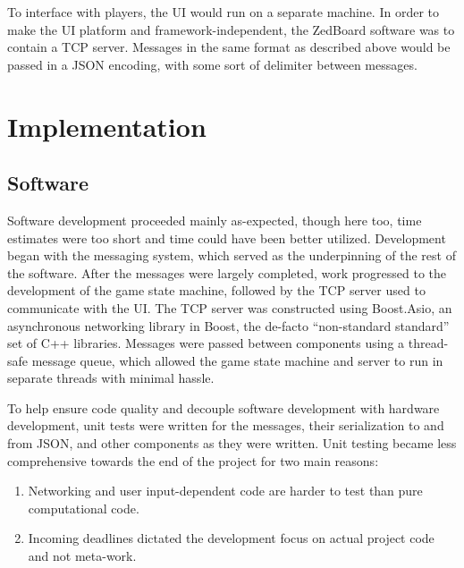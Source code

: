 \documentclass[oneside]{book}
\begin{document}
To interface with players, the UI would run on a separate machine.
In order to make the UI platform and framework-independent,
the ZedBoard software was to contain a TCP server.
Messages in the same format as described above would be passed in a JSON encoding,
with some sort of delimiter between messages.

\section{Implementation}

\subsection{Software}

Software development proceeded mainly as-expected, though here too,
time estimates were too short and time could have been better utilized.
Development began with the messaging system,
which served as the underpinning of the rest of the software.
After the messages were largely completed,
work progressed to the development of the game state machine,
followed by the TCP server used to communicate with the UI.
The TCP server was constructed using Boost.Asio,
an asynchronous networking library in Boost,
the de-facto ``non-standard standard'' set of C++ libraries.
Messages were passed between components using a thread-safe message queue,
which allowed the game state machine and server to run in separate threads
with minimal hassle.

To help ensure code quality and decouple software development with hardware development,
unit tests were written for the messages, their serialization to and from JSON,
and other components as they were written.
Unit testing became less comprehensive towards the end of the project for two main reasons:
\begin{enumerate}
\item Networking and user input-dependent code are harder to test than pure computational code.
\item Incoming deadlines dictated the development focus on actual project code and not meta-work.
\end{enumerate}
\end{document}
